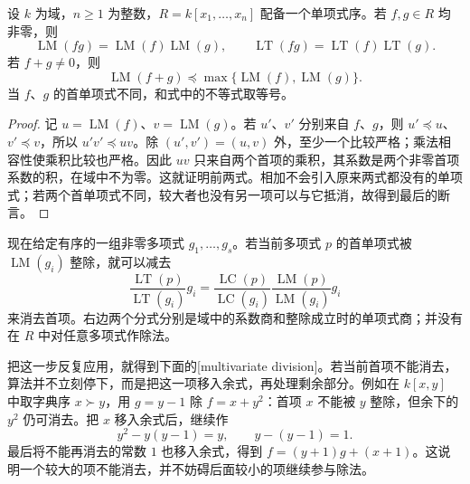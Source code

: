 \begin{proposition}\label{b1:prop:F-leading-product}
	设 \(k\) 为域，\(n\geq1\) 为整数，\(R=k[x_1,\ldots,x_n]\) 配备一个单项式序。若 \(f,g\in R\) 均非零，则
	\[
		\operatorname{LM}(fg)=\operatorname{LM}(f)\operatorname{LM}(g),\qquad \operatorname{LT}(fg)=\operatorname{LT}(f)\operatorname{LT}(g).
	\]
	若 \(f+g\ne0\)，则
	\[
		\operatorname{LM}(f+g)\preceq \max\bigl\{\operatorname{LM}(f),\operatorname{LM}(g)\bigr\}.
	\]
	当 \(f\)、\(g\) 的首单项式不同，和式中的不等式取等号。
\end{proposition}
\begin{proof}
	记 \(u=\operatorname{LM}(f)\)、\(v=\operatorname{LM}(g)\)。若 \(u'\)、\(v'\) 分别来自 \(f\)、\(g\)，则 \(u'\preceq u\)、\(v'\preceq v\)，所以 \(u'v'\preceq uv\)。除 \((u',v')=(u,v)\) 外，至少一个比较严格；乘法相容性使乘积比较也严格。因此 \(uv\) 只来自两个首项的乘积，其系数是两个非零首项系数的积，在域中不为零。这就证明前两式。相加不会引入原来两式都没有的单项式；若两个首单项式不同，较大者也没有另一项可以与它抵消，故得到最后的断言。
\end{proof}

现在给定有序的一组非零多项式 \(g_1,\ldots,g_s\)。若当前多项式 \(p\) 的首单项式被 \(\operatorname{LM}(g_i)\) 整除，就可以减去
\[
	\frac{\operatorname{LT}(p)}{\operatorname{LT}(g_i)}g_i =\frac{\operatorname{LC}(p)}{\operatorname{LC}(g_i)} \frac{\operatorname{LM}(p)}{\operatorname{LM}(g_i)}g_i
\]
来消去首项。右边两个分式分别是域中的系数商和整除成立时的单项式商；并没有在 \(R\) 中对任意多项式作除法。

\ProseParagraphBreak
把这一步反复应用，就得到下面的[multivariate division]。若当前首项不能消去，算法并不立刻停下，而是把这一项移入余式，再处理剩余部分。例如在 \(k[x,y]\) 中取字典序 \(x\succ y\)，用 \(g=y-1\) 除 \(f=x+y^2\)：首项 \(x\) 不能被 \(y\) 整除，但余下的 \(y^2\) 仍可消去。把 \(x\) 移入余式后，继续作
\[
	y^2-y(y-1)=y,\qquad y-(y-1)=1.
\]
最后将不能再消去的常数 \(1\) 也移入余式，得到 \(f=(y+1)g+(x+1)\)。这说明一个较大的项不能消去，并不妨碍后面较小的项继续参与除法。


